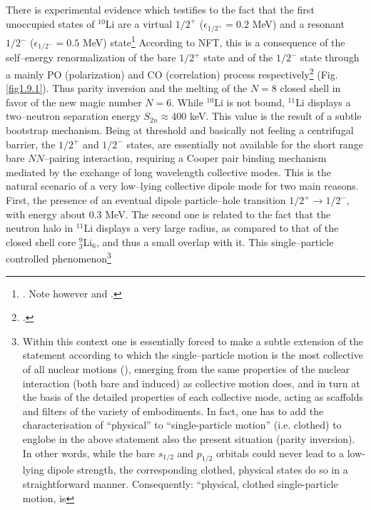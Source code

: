 There is  experimental evidence which testifies to the fact that the first unoccupied states of $^{10}$Li are a virtual $1/2^+$ ($\epsilon_{1/2^+}=0.2$ MeV) and a resonant $1/2^-$ ($\epsilon_{1/2^-}=0.5$ MeV) state\footnote{\cite{Zinser:95}. Note however \cite{Cavallaro:17} and \cite{Sanetullaev:16}.}   According to NFT, this is a consequence of the self--energy renormalization of the bare $1/2^+$ state and of the $1/2^-$ state through a mainly PO (polarization) and CO (correlation) process respectively\footnote{\cite{Barranco:01}.} (Fig. \ref{fig1.9.1}). Thus parity inversion and the melting of  the $N=8$ closed shell in favor of the new magic number $N=6$. While $^{10}$Li is not bound, $^{11}$Li displays a two--neutron separation energy $S_{2n}\approx400$ keV.  This value  is the result of a subtle bootstrap mechanism. Being at threshold and basically not feeling a centrifugal barrier, the $1/2^+$ and $1/2^-$ states, are essentially not available for the short range bare $NN$--pairing interaction, requiring a Cooper pair binding mechanism mediated by  the exchange of  long wavelength collective modes. This is the natural scenario of a very low--lying collective dipole mode for two main reasons. First, the presence of an eventual dipole particle--hole transition $1/2^+\rightarrow 1/2^-$, with energy about 0.3 MeV. The second one is related to  the fact that the neutron halo in $^{11}$Li displays a very large radius, as compared to that of the closed shell core $^9_3$Li$_6$, and thus a small overlap with it. This single--particle controlled phenomenon\footnote{Within this context one is essentially forced to make a subtle  extension of the statement according to which  the single--particle motion is the most collective  
of all nuclear motions (\cite{Mottelson:62}), emerging from  the same properties  of the nuclear interaction 
(both bare and induced) as collective motion does, 
and in turn at the basis of the detailed properties of each collective mode, acting as
 scaffolds and filters of the variety of embodiments. In fact, one 
has  to add the characterisation of ``physical'' to ``single-particle motion'' (i.e. clothed) to englobe in  the above statement 
also the present  situation (parity inversion). In other words, while the bare $s_{1/2}$ and $p_{1/2}$ orbitals could never lead to a low-lying dipole strength, the corresponding 
 clothed, physical states do so in a straightforward manner. Consequently: ``physical,  clothed single-particle motion, is 
}
